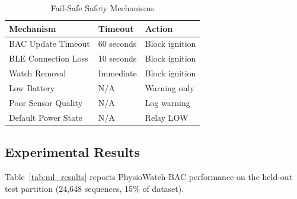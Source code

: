 \documentclass[HARVARD,Times2COL]{WileyNJDv5}
\begin{document}
\begin{table}[htbp]
\caption{Fail-Safe Safety Mechanisms}
\label{tab:failsafes}
\centering
\small
\begin{tabular}{@{}lll@{}}
\toprule
\textbf{Mechanism} & \textbf{Timeout} & \textbf{Action} \\
\midrule
BAC Update Timeout & 60 seconds & Block ignition \\
BLE Connection Loss & 10 seconds & Block ignition \\
Watch Removal & Immediate & Block ignition \\
Low Battery & N/A & Warning only \\
Poor Sensor Quality & N/A & Log warning \\
Default Power State & N/A & Relay LOW \\
\bottomrule
\end{tabular}
\end{table}
\subsection{Experimental Results}
Table~\ref{tab:ml_results} reports PhysioWatch-BAC performance on the held-out test partition (24,648 sequences, 15\% of dataset).
\end{document}
